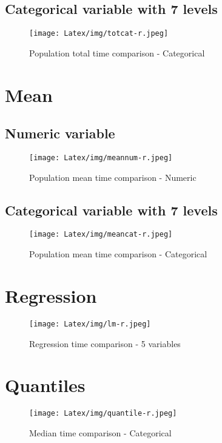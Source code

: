 \subsection{Categorical variable with 7 levels}

\begin{figure}[H]
    \centering
    \texttt{[image: Latex/img/totcat-r.jpeg]}
    \caption{Population total time comparison - Categorical}
    \label{fig:totcat-r}
\end{figure}

\section{Mean}
\subsection{Numeric variable}
\begin{figure}[H]
    \centering
    \texttt{[image: Latex/img/meannum-r.jpeg]}
    \caption{Population mean time comparison - Numeric}
    \label{fig:meannum-r}
\end{figure}

\subsection{Categorical variable with 7 levels}
\begin{figure}[H]
   \centering
    \texttt{[image: Latex/img/meancat-r.jpeg]}
    \caption{Population mean time comparison - Categorical}
    \label{fig:meancat-r}
\end{figure}

 

\section{Regression}
\begin{figure}[H]
   \centering
    \texttt{[image: Latex/img/lm-r.jpeg]}
    \caption{Regression time comparison - 5 variables}
    \label{fig:lm-r}
\end{figure}
\section{Quantiles}
\begin{figure}[H]
   \centering
    \texttt{[image: Latex/img/quantile-r.jpeg]}
    \caption{Median time comparison - Categorical}
    \label{fig:quantile-r}
\end{figure}
